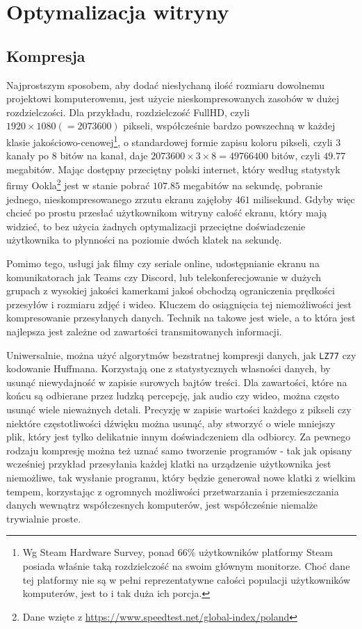 \documentclass[licencjacka]{pracadypl}
\begin{document}
\chapter{Optymalizacja witryny}
\section{Kompresja}
Najprostszym sposobem, aby dodać niesłychaną ilość rozmiaru dowolnemu projektowi komputerowemu, jest użycie nieskompresowanych zasobów w dużej rozdzielczości. Dla przykładu, rozdzielczość FullHD, czyli $1920\times1080\left(=2073600\right)$ pikseli, współcześnie bardzo powszechną w każdej klasie jakościowo-cenowej\footnote{Wg Steam Hardware Survey, ponad 66\% użytkowników platformy Steam posiada właśnie taką rozdzielczość na swoim głównym monitorze. Choć dane tej platformy nie są w pełni reprezentatywne całości populacji użytkowników komputerów, jest to i tak duża ich porcja.}, o standardowej formie zapisu koloru pikseli, czyli 3 kanały po 8 bitów na kanał, daje $2073600\times3\times8 = 49766400$ bitów, czyli $49.77$ megabitów. Mając dostępny przeciętny polski internet, który według statystyk firmy Ookla\footnote{Dane wzięte z \url{https://www.speedtest.net/global-index/poland}} jest w stanie pobrać $107.85$ megabitów na sekundę, pobranie jednego, nieskompresowanego zrzutu ekranu zajęłoby $461$ milisekund. Gdyby więc chcieć po prostu przesłać użytkownikom witryny całość ekranu, który mają widzieć, to bez użycia żadnych optymalizacji przeciętne doświadczenie użytkownika to płynności na poziomie dwóch klatek na sekundę.

Pomimo tego, usługi jak filmy czy seriale online, udostępnianie ekranu na komunikatorach jak Teams czy Discord, lub telekonferecjowanie w dużych grupach z wysokiej jakości kamerkami jakoś obchodzą ograniczenia prędkości przesyłów i rozmiaru zdjęć i wideo. \linebreak Kluczem do osiągnięcia tej niemożliwości jest kompresowanie przesyłanych danych. Technik na takowe jest wiele, a to która jest najlepsza jest zależne od zawartości transmitowanych informacji.

Uniwersalnie, można użyć algorytmów bezstratnej kompresji danych, jak \texttt{LZ77} czy kodowanie Huffmana. Korzystają one z statystycznych własności danych, by usunąć niewydajność w zapisie surowych bajtów treści. Dla zawartości, które na końcu są odbierane przez ludzką percepcję, jak audio czy wideo, można często usunąć wiele nieważnych detali. Precyzję w zapisie wartości każdego z pikseli czy niektóre częstotliwości dźwięku można usunąć, aby stworzyć o wiele mniejszy plik, który jest tylko delikatnie innym doświadczeniem dla odbiorcy. Za pewnego rodzaju kompresję można też uznać samo tworzenie programów - tak jak opisany wcześniej przykład przesyłania każdej klatki na urządzenie użytkownika jest niemożliwe, tak wysłanie programu, który będzie generował nowe klatki z wielkim tempem, korzystając z ogromnych możliwości przetwarzania i przemieszczania danych wewnątrz współczesnych komputerów, jest współcześnie niemalże trywialnie proste.
\end{document}
